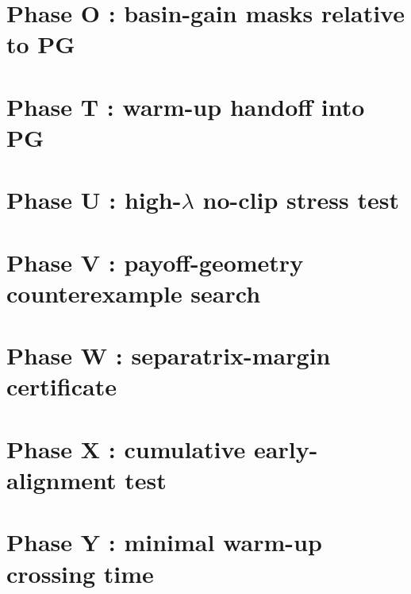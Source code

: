 \documentclass[11pt]{article}
\begin{document}


\section{Phase O : basin-gain masks relative to PG}\label{sec:phase-o}



\section{Phase T : warm-up handoff into PG}\label{sec:phase-t}



\section{Phase U : high-$\lambda$ no-clip stress test}\label{sec:phase-u}



\section{Phase V : payoff-geometry counterexample search}\label{sec:phase-v}



\section{Phase W : separatrix-margin certificate}\label{sec:phase-w}



\section{Phase X : cumulative early-alignment test}\label{sec:phase-x}



\section{Phase Y : minimal warm-up crossing time}\label{sec:phase-y}
\end{document}
